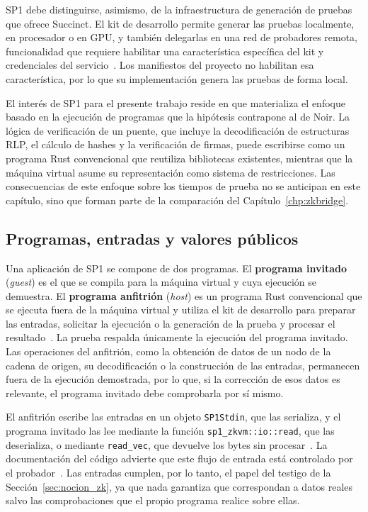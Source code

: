 SP1 debe distinguirse, asimismo, de la infraestructura de generación de pruebas que ofrece
Succinct. El kit de desarrollo permite generar las pruebas localmente, en procesador o en GPU, y
también delegarlas en una red de probadores remota, funcionalidad que requiere habilitar una
característica específica del kit y credenciales del servicio~\cite{sp1repo}. Los manifiestos del
proyecto no habilitan esa característica, por lo que su implementación genera las pruebas de forma
local.

El interés de SP1 para el presente trabajo reside en que materializa el enfoque basado en la
ejecución de programas que la hipótesis contrapone al de Noir. La lógica de verificación de un
puente, que incluye la decodificación de estructuras RLP, el cálculo de hashes y la verificación de
firmas, puede escribirse como un programa Rust convencional que reutiliza bibliotecas existentes,
mientras que la máquina virtual asume su representación como sistema de restricciones. Las
consecuencias de este enfoque sobre los tiempos de prueba no se anticipan en este capítulo, sino
que forman parte de la comparación del Capítulo~\ref{chp:zkbridge}.

\subsection{Programas, entradas y valores públicos}
\label{sec:sp1_programas}

Una aplicación de SP1 se compone de dos programas. El \textbf{programa invitado}
(\textit{guest}) es el que se compila para la máquina virtual y cuya ejecución se demuestra. El
\textbf{programa anfitrión} (\textit{host}) es un programa Rust convencional que se ejecuta fuera
de la máquina virtual y utiliza el kit de desarrollo para preparar las entradas, solicitar la
ejecución o la generación de la prueba y procesar el resultado~\cite{sp1repo, sp1docsv6}. La prueba
respalda únicamente la ejecución del programa invitado. Las operaciones del anfitrión, como la
obtención de datos de un nodo de la cadena de origen, su decodificación o la construcción de las
entradas, permanecen fuera de la ejecución demostrada, por lo que, si la corrección de esos datos
es relevante, el programa invitado debe comprobarla por sí mismo.

El anfitrión escribe las entradas en un objeto \texttt{SP1Stdin}, que las serializa, y el programa
invitado las lee mediante la función \lstinline|sp1_zkvm::io::read|, que las deserializa, o
mediante \lstinline|read_vec|, que devuelve los bytes sin procesar~\cite{sp1repo}. La
documentación del código advierte que este flujo de entrada está controlado por el
probador~\cite{sp1repo}. Las entradas cumplen, por lo tanto, el papel del testigo de la
Sección~\ref{sec:nocion_zk}, ya que nada garantiza que correspondan a datos reales salvo las
comprobaciones que el propio programa realice sobre ellas.

